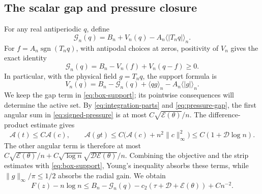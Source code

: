 \documentclass[11pt,reqno]{amsart}
\numberwithin{equation}{section}
\theoremstyle{definition}
\theoremstyle{remark}
\newcommand{\A}{\mathcal A}
\newcommand{\E}{\mathcal E}
\newcommand{\av}[1]{\langle #1\rangle_n}
\newcommand{\norm}[1]{\lVert #1\rVert}
\DeclareMathOperator{\sgn}{sgn}
\begin{document}
\subsection{The scalar gap and pressure closure}
For any real antiperiodic $q$, define
\begin{equation}\label{eq:scalar-gap}
 \mathscr G_n(q)=B_n+V_n(q)-A_n\av{|T_nq|}.
\end{equation}
For $f=A_n\sgn(T_nq)$, with antipodal choices at zeros, positivity of $V_n$ gives the exact identity
\begin{equation}\label{eq:gap-splitting}
 \mathscr G_n(q)=B_n-V_n(f)+V_n(q-f)\ge0.
\end{equation}
In particular, with the physical field $g=T_nq$, the support formula is
\begin{equation}\label{eq:box-support}
 V_n(q)=B_n-\mathscr G_n(q)+\av{qg}-A_n\av{|g|}.
\end{equation}
We keep the gap term in \eqref{eq:box-support}; its pointwise consequences will determine the active set. By \eqref{eq:integration-parts} and \eqref{eq:pressure-gap}, the first angular sum in \eqref{eq:signed-pressure} is at most $C\sqrt{\E(\theta)}/n$. The difference-product estimate gives
\begin{equation}\label{eq:product-pressure}
 \A(t)\le C\A(c),\qquad
 \A(gt)\le C\bigl(\A(c)+n^2\norm c_\infty^2\bigr)\le C(1+\mathscr D\log n).
\end{equation}
The other angular term is therefore at most
$C\sqrt{\E(\theta)}/n+C\sqrt{\log n}\sqrt{\mathscr D\E(\theta)}/n$.
Combining the objective and the strip estimates with \eqref{eq:box-support}, Young's inequality absorbs these terms, while $\norm g_\infty/\pi\le1/2$ absorbs the radial gain. We obtain
\begin{equation}\label{eq:pressure-final-upper}
 F(z)-n\log n\le B_n-\mathscr G_n(q)-c_2(\tau+\mathscr D+\E(\theta))+Cn^{-2}.
\end{equation}
\end{document}

